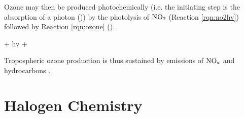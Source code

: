 Ozone may then be produced photochemically (i.e. the initiating step is the absorption of a photon (\cite{Cadle1970})) by the photolysis of $\mathrm{NO_2}$ (Reaction \ref{rqn:no2hv}) followed by Reaction \ref{rqn:ozone} (\cite{Hesstvedt1978}).


\begin{reaction}
     + hv \rightarrow {} + 
    \label{rqn:no2hv}
\end{reaction}

Tropospheric ozone production is thus sustained by emissions of $\mathrm{NO_x}$ and hydrocarbons \cite{Jacob1999}. 







%





\section{Halogen Chemistry}\label{sec:halogen_chemistry}


